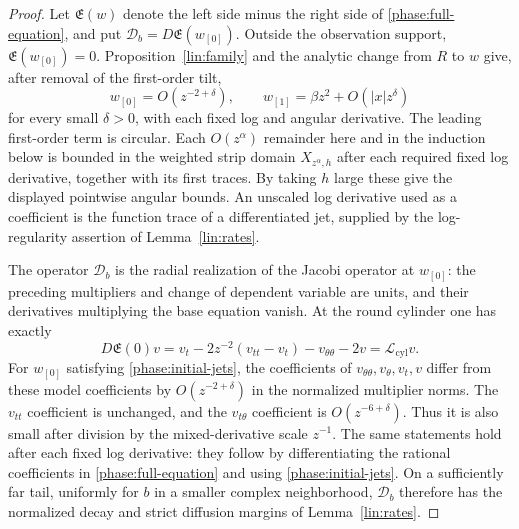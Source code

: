 \begin{proof}
Let $\mathfrak E(w)$ denote the left side minus the right side of
\eqref{phase:full-equation}, and put
$\mathcal D_b=D\mathfrak E(w_{[0]})$.  Outside the observation support,
$\mathfrak E(w_{[0]})=0$.  Proposition~\ref{lin:family} and the
analytic change from $R$ to $w$ give, after removal of the first-order
tilt,
\begin{equation}
 w_{[0]}=O(z^{-2+\delta}),\qquad
 w_{[1]}=\beta z^2+O(|x|z^\delta)
 \label{phase:initial-jets}
\end{equation}
for every small $\delta>0$, with each fixed log and angular derivative.
The leading first-order term is circular.  Each $O(z^\alpha)$ remainder
here and in the induction below is bounded in the weighted strip domain
$X_{z^\alpha,h}$ after each required fixed log derivative, together
with its first traces.  By taking $h$ large these give the displayed
pointwise angular bounds.  An unscaled log derivative used as a
coefficient is the function trace of a differentiated jet, supplied by
the log-regularity assertion of Lemma~\ref{lin:rates}.

The operator $\mathcal D_b$ is the radial realization of the Jacobi
operator at $w_{[0]}$: the preceding multipliers and change of dependent
variable are units, and their derivatives multiplying the base equation
vanish.  At the round cylinder one has exactly
\[
 D\mathfrak E(0)v
 =v_t-2z^{-2}(v_{tt}-v_t)-v_{\theta\theta}-2v
 =\mathcal L_{\mathrm{cyl}}v.
\]
For $w_{[0]}$ satisfying \eqref{phase:initial-jets}, the coefficients
of $v_{\theta\theta},v_\theta,v_t,v$ differ from these model coefficients
by $O(z^{-2+\delta})$ in the normalized multiplier norms.  The
$v_{tt}$ coefficient is unchanged, and the $v_{t\theta}$ coefficient
is $O(z^{-6+\delta})$.  Thus it is also small after division by the
mixed-derivative scale $z^{-1}$.  The same statements hold after each
fixed log derivative: they follow by differentiating the rational
coefficients in \eqref{phase:full-equation} and using
\eqref{phase:initial-jets}.  On a sufficiently far tail, uniformly for
$b$ in a smaller complex neighborhood, $\mathcal D_b$ therefore has
the normalized decay and strict diffusion margins of
Lemma~\ref{lin:rates}.


\end{proof}
